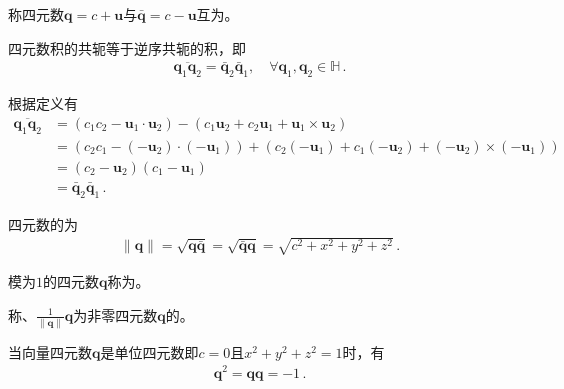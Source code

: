 \begin{definition}
    称四元数${\bm q}=c+{\bm u}$与$\bar{\bm q}=c-{\bm u}$互为。
\end{definition}
\begin{proposition}
    四元数积的共轭等于逆序共轭的积，即
    \begin{align}
        \overline{{\bm q}_1{\bm q}_2}=\bar{\bm q}_2\bar{\bm q}_1, \quad\forall {\bm q}_1, {\bm q}_2\in\mathbb{H}\, .
    \end{align}
\end{proposition}
\begin{prove}
    根据定义有
    \begin{align}
        \overline{{\bm q}_1{\bm q}_2} & =(c_1c_2-{\bm u}_1\cdot{\bm u}_2)-(c_1{\bm u}_2+c_2{\bm u}_1+{\bm u}_1\times{\bm u}_2)\nonumber                   \\
                                      & =(c_2c_1-(-{\bm u}_2)\cdot(-{\bm u}_1))+(c_2(-{\bm u}_1)+c_1(-{\bm u}_2)+(-{\bm u}_2)\times(-{\bm u}_1))\nonumber \\
                                      & =(c_2-{\bm u}_2)(c_1-{\bm u}_1)\nonumber                                                                          \\
                                      & =\bar{\bm q}_2\bar{\bm q}_1\, .
    \end{align}
\end{prove}
\begin{definition}
    四元数的为
    \begin{align}
        \|{\bm q}\|=\sqrt{{\bm q}\bar{\bm q}}=\sqrt{\bar{\bm q}{\bm q}}=\sqrt{c^2+x^2+y^2+z^2}\, .
    \end{align}
\end{definition}
\begin{definition}
    模为$1$的四元数${\bm q}$称为。
\end{definition}
\begin{definition}
    称$、\displaystyle\frac{1}{\|{\bm q}\|}{\bm q}$为非零四元数${\bm q}$的。
\end{definition}
\begin{proposition}
    当向量四元数${\bm q}$是单位四元数即$c=0$且$x^2+y^2+z^2=1$时，有
    \begin{align}
        {\bm q}^2={\bm q}{\bm q}=-1\, .
    \end{align}
\end{proposition}
